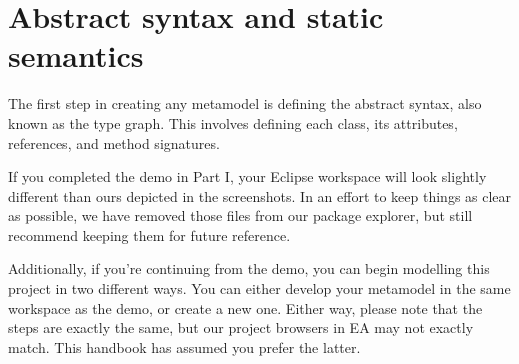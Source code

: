 \newpage
\section{Abstract syntax and static semantics}
\genHeader
\label{sec: staticSemantics}

The first step in creating any metamodel is defining the abstract syntax, also known as the type graph. This involves defining each class, its attributes,
references, and method signatures.

If you completed the demo in Part I, your Eclipse workspace will look slightly different than ours depicted in the screenshots.
In an effort to keep things as clear as possible, we have removed those files from our package explorer, but still recommend keeping them for future reference. 

Additionally, if you're continuing from the demo, you can begin modelling this project in two different ways. 
You can either develop your metamodel in the same workspace as the demo, or create a new one.
Either way, please note that the steps are exactly the same, but our project browsers in EA may not exactly match.
This handbook has assumed you prefer the latter.












 
